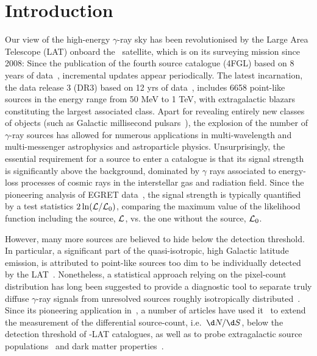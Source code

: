 \section{Introduction}

Our view of the high-energy $\gamma$-ray sky has been revolutionised  by the Large Area Telescope (LAT) onboard the \Fermi~satellite, which is on its surveying mission since 2008: Since the publication of the fourth source  catalogue (4FGL) based on 8 years of data~\cite{Fermi-LAT:2019yla}, incremental updates appear periodically. The latest incarnation, the data release 3 (DR3) based on 12 yrs of data~\cite{2022ApJS..260...53A}, includes 6658 point-like sources in the energy range from 50 MeV to 1 TeV, with extragalactic blazars constituting the largest associated class. Apart for revealing entirely new classes of objects (such as Galactic millisecond pulsars~\cite{Caraveo:2013lra}), the explosion of the number of $\gamma$-ray sources has allowed for numerous applications in multi-wavelength and multi-messenger astrophysics and astroparticle physics. Unsurprisingly, the essential requirement for a source to enter a catalogue is  that its signal strength is significantly above the background, dominated by $\gamma$ rays associated to energy-loss processes of cosmic rays in the interstellar gas and radiation field. Since the pioneering analysis of EGRET data~\cite{Mattox:1996zz}, the signal strength is typically quantified by a test statistics $2\ln({\cal L}/{\cal L}_0)$,  comparing the maximum value of the likelihood function including the source, ${\cal L}$, vs. the one without the source, ${\cal L}_0$. 

However, many more sources are believed to hide below the detection threshold. In particular, a significant part of the quasi-isotropic, high Galactic latitude emission, is attributed to point-like sources too dim to be individually detected by the LAT~\cite{Fornasa:2015qua}. Nonetheless, a statistical approach relying on the pixel-count distribution has long been suggested to provide a diagnostic tool to 
separate truly diffuse $\gamma$-ray signals from unresolved sources roughly isotropically distributed~\cite{Dodelson:2009ih}. Since its pioneering application in~\cite{Malyshev:2011zi}, a number of articles have used it~\cite{Zechlin:2015wdz,Zechlin:2016pme,Lisanti:2016jub}
to extend the measurement of the differential source-count, i.e.~$\d N/\d S$, below the detection threshold of \Fermi-LAT catalogues, as well as to probe extragalactic source populations~\cite{Manconi:2019ynl} and dark matter properties~\cite{Zechlin:2017uzo,Chang:2018bpt}. 


